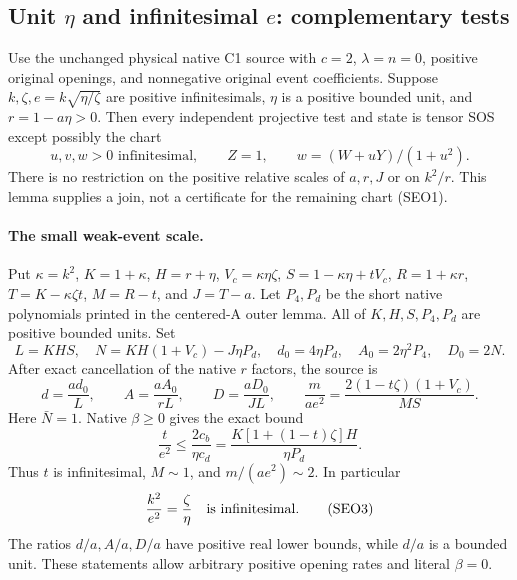 \subsection{Unit $\eta$ and infinitesimal $e$: complementary tests}

\label{component:p05a86be0046c}

\label{p05a86be0046c:sec:small-e-outer}

\begin{lemma}
Use the unchanged physical native C1 source with $c=2$,
$\lambda=n=0$, positive original openings, and nonnegative original
event coefficients. Suppose $k,\zeta,e=k\sqrt{\eta/\zeta}$ are positive
infinitesimals, $\eta$ is a positive bounded unit, and
$r=1-a\eta>0$. Then every independent projective test and state is
tensor SOS except possibly the chart
\[
 u,v,w>0\text{ infinitesimal},\qquad Z=1,
 \qquad w=(W+uY)/(1+u^2).
 \tag{SEO1}
\]
There is no restriction on the positive relative scales of $a,r,J$
or on $k^2/r$. This lemma supplies a join, not a certificate for the
remaining chart (SEO1).
\end{lemma}

\paragraph{The small weak-event scale.}
Put $\kappa=k^2$, $K=1+\kappa$, $H=r+\eta$,
$V_c=\kappa\eta\zeta$, $S=1-\kappa\eta+tV_c$,
$R=1+\kappa r$, $T=K-\kappa\zeta t$,
$M=R-t$, and $J=T-a$. Let $P_4,P_d$ be the short native
polynomials printed in the centered-A outer lemma. All of
$K,H,S,P_4,P_d$ are positive bounded units. Set
\[
 L=KHS,\quad N=KH(1+V_c)-J\eta P_d,\quad
 d_0=4\eta P_d,\quad A_0=2\eta^2P_4,\quad D_0=2N.
\]
After exact cancellation of the native $r$ factors, the source is
\[
 d=\frac{ad_0}{L},\qquad A=\frac{aA_0}{rL},\qquad
 D=\frac{aD_0}{JL},\qquad
 \frac{m}{ae^2}=
 \frac{2(1-t\zeta)(1+V_c)}{MS}.                 \tag{SEO2}
\]
Here $\bar N=1$. Native $\beta\ge0$ gives the exact bound
\[
 \frac{t}{e^2}\le\frac{2c_b}{\eta c_d}
 =\frac{K[1+(1-t)\zeta]H}{\eta P_d}.
\]
Thus $t$ is infinitesimal, $M\sim1$, and $m/(ae^2)\sim2$.
In particular
\[
 \frac{k^2}{e^2}=\frac\zeta\eta
 \quad\hbox{is infinitesimal}.                       \tag{SEO3}
\]
The ratios $d/a,A/a,D/a$ have positive real lower bounds, while
$d/a$ is a bounded unit. These statements allow arbitrary positive
opening rates and literal $\beta=0$.

